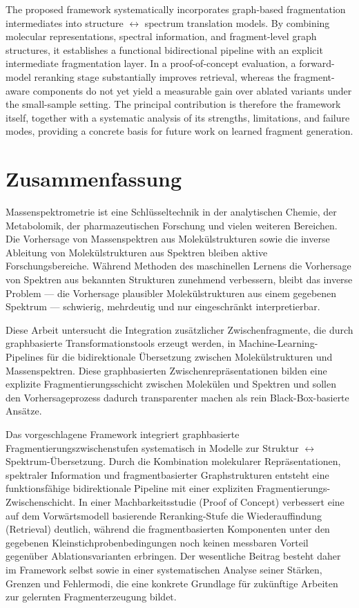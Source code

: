 The proposed framework systematically incorporates graph-based fragmentation intermediates into structure $\leftrightarrow$ spectrum translation models.
By combining molecular representations, spectral information, and fragment-level graph structures, it establishes a functional bidirectional pipeline with an explicit intermediate fragmentation layer.
In a proof-of-concept evaluation, a forward-model reranking stage substantially improves retrieval, whereas the fragment-aware components do not yet yield a measurable gain over ablated variants under the small-sample setting.
The principal contribution is therefore the framework itself, together with a systematic analysis of its strengths, limitations, and failure modes, providing a concrete basis for future work on learned fragment generation.

{}
\clearpage
\chapter*{Zusammenfassung}
Massenspektrometrie ist eine Schlüsseltechnik in der analytischen Chemie, der Metabolomik, der pharmazeutischen Forschung und vielen weiteren Bereichen.
Die Vorhersage von Massenspektren aus Molekülstrukturen sowie die inverse Ableitung von Molekülstrukturen aus Spektren bleiben aktive Forschungsbereiche.
Während Methoden des maschinellen Lernens die Vorhersage von Spektren aus bekannten Strukturen zunehmend verbessern, bleibt das inverse Problem --- die Vorhersage plausibler Molekülstrukturen aus einem gegebenen Spektrum --- schwierig, mehrdeutig und nur eingeschränkt interpretierbar.

Diese Arbeit untersucht die Integration zusätzlicher Zwischenfragmente, die durch graphbasierte Transformationstools erzeugt werden, in Machine-Learning-Pipelines für die bidirektionale Übersetzung zwischen Molekülstrukturen und Massenspektren.
Diese graphbasierten Zwischenrepräsentationen bilden eine explizite Fragmentierungsschicht zwischen Molekülen und Spektren und sollen den Vorhersageprozess dadurch transparenter machen als rein Black-Box-basierte Ansätze.

Das vorgeschlagene Framework integriert graphbasierte Fragmentierungszwischenstufen systematisch in Modelle zur Struktur $\leftrightarrow$ Spektrum-Übersetzung.
Durch die Kombination molekularer Repräsentationen, spektraler Information und fragmentbasierter Graphstrukturen entsteht eine funktionsfähige bidirektionale Pipeline mit einer expliziten Fragmentierungs-Zwischenschicht.
In einer Machbarkeitsstudie (Proof of Concept) verbessert eine auf dem Vorwärtsmodell basierende Reranking-Stufe die Wiederauffindung (Retrieval) deutlich, während die fragmentbasierten Komponenten unter den gegebenen Kleinstichprobenbedingungen noch keinen messbaren Vorteil gegenüber Ablationsvarianten erbringen.
Der wesentliche Beitrag besteht daher im Framework selbst sowie in einer systematischen Analyse seiner Stärken, Grenzen und Fehlermodi, die eine konkrete Grundlage für zukünftige Arbeiten zur gelernten Fragmenterzeugung bildet.

{}
\listoftables
{}
{}
\listoffigures
{}
{}
